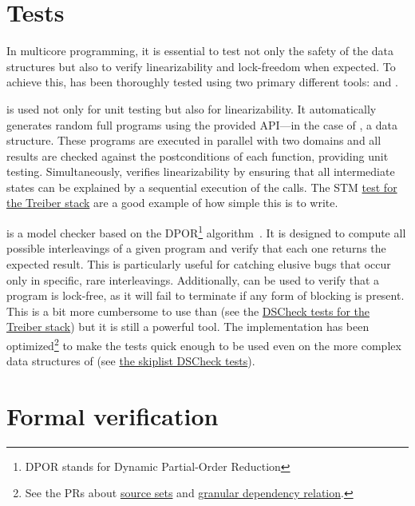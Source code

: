 \documentclass[a4paper, 11pt]{article}
\begin{document}
\section{Tests}

In multicore programming, it is essential to test not only the safety of the data structures but also to verify linearizability and lock-freedom when expected.
To achieve this, \Saturn has been thoroughly tested using two primary different tools: \DSCheck and \STM.

\STM is used not only for unit testing but also for linearizability.
It automatically generates random full programs using the provided API---in the case of \Saturn, a data structure.
These programs are executed in parallel with two domains and all results are checked against the postconditions of each function, providing unit testing.
Simultaneously, \STM verifies linearizability by ensuring that all intermediate states can be explained by a sequential execution of the calls. The STM \href{https://github.com/ocaml-multicore/saturn/blob/main/test/treiber_stack/stm_treiber_stack.ml}{test for the Treiber stack} are a good example of how simple this is to write.

\DSCheck is a model checker based on the DPOR\footnote[2]{DPOR stands for Dynamic Partial-Order Reduction} algorithm~\cite{dpor05}.
It is designed to compute all possible interleavings of a given program and verify that each one returns the expected result.
This is particularly useful for catching elusive bugs that occur only in specific, rare interleavings.
Additionally, \DSCheck can be used to verify that a program is lock-free, as it will fail to terminate if any form of blocking is present. This is a bit more cumbersome to use than \STM (see the \href{https://github.com/ocaml-multicore/saturn/blob/main/test/treiber_stack/treiber_stack_dscheck.ml}{DSCheck tests for the Treiber stack}) but it is still a powerful tool. The implementation has been optimized\footnote[2]{See the PRs about \href{https://github.com/ocaml-multicore/dscheck/pull/18}{source sets} and \href{https://github.com/ocaml-multicore/dscheck/pull/22}{granular dependency relation}.} to make the tests quick enough to be used even on the more complex data structures of \Saturn (see \href{https://github.com/ocaml-multicore/saturn/blob/main/test/skiplist/stm_skiplist.ml}{the skiplist DSCheck tests}).

\section{Formal verification}
\end{document}
